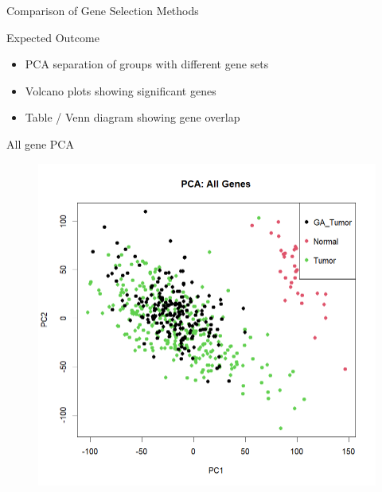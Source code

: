 \documentclass[12pt, aspectratio=43]{beamer}
\begin{document}
		\begin{frame}{Comparison of Gene Selection Methods}
		\begin{block}{Expected Outcome}
			\begin{itemize}
				\item PCA separation of groups with different gene sets
				\item Volcano plots showing significant genes
				\item Table / Venn diagram showing gene overlap
			\end{itemize}
		\end{block}
		
	\end{frame}
	
	
	\begin{frame}{All gene PCA}
		\begin{figure}[h!]
			\centering
			\includegraphics[width=0.8\linewidth]{allgene.png}
		\end{figure}
	\end{frame}
	
\end{document}
